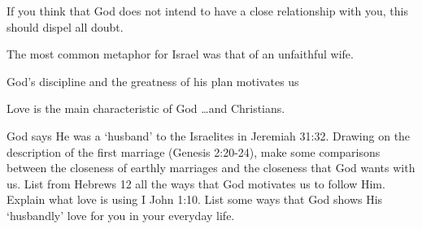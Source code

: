 \begin{discussion}



 If you think that God does not intend to have a close relationship with you, this should dispel all doubt.

The most common metaphor for Israel was that of an unfaithful wife.


 God's discipline and the greatness of his plan motivates us


 Love is the main characteristic of God \ldots and Christians.

\end{discussion}

\begin{questions}
\q God says He was a `husband' to the Israelites in Jeremiah 31:32.  Drawing on the description of the first marriage (Genesis 2:20-24), make some comparisons between the closeness of earthly marriages and the closeness that God wants with us. 
\q List from Hebrews 12 all the ways that God motivates us to follow Him.
\q Explain what love is using I John 1:10.
\q List some ways that God shows His `husbandly' love for you in your everyday life.
\end{questions}